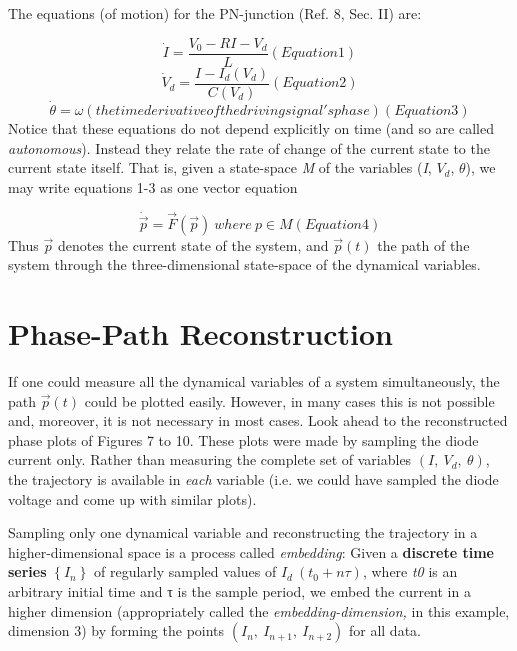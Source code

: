 \documentclass{../lab}
\begin{document}
The equations (of motion) for the PN-junction (Ref. 8, Sec. II) are:

\begin{equation}
    \dot I = \frac{V_0-RI-V_d}{L}  (Equation 1)
\end{equation}
\begin{equation}
    \dot V_d = \frac{I-I_d(V_d)}{C(V_d)}  (Equation 2)
\end{equation}
\begin{equation}
    \dot \theta =\omega  (the time derivative of the driving signal's phase) (Equation 3)
\end{equation}
Notice that these equations do not depend explicitly on time (and so are called \emph{autonomous}). Instead they relate the rate of change of the current state to the current state itself. That is, given a state-space \emph{M} of the variables (\emph{I}, $V_d$, $ \theta $), we may write equations 1-3 as one vector equation

\begin{equation}
    \dot{\vec p}=\vec F (\vec p)~where~p \in M  (Equation 4)
\end{equation}
Thus $ \vec p $ denotes the current state of the system, and $ \vec p(t) $ the path of the system through the three-dimensional state-space of the dynamical variables.

\section{Phase-Path Reconstruction}

If one could measure all the dynamical variables of a system simultaneously, the path $ \vec p(t) $ could be plotted easily. However, in many cases this is not possible and, moreover, it is not necessary in most cases. Look ahead to the reconstructed phase plots of Figures 7 to 10. These plots were made by sampling the diode current only. Rather than measuring the complete set of variables $ (I,~V_d,~\theta) $, the trajectory is available in \emph{each} variable (i.e. we could have sampled the diode voltage and come up with similar plots).

Sampling only one dynamical variable and reconstructing the trajectory in a higher-dimensional space is a process called \emph{embedding}: Given a \textbf{discrete time series} $ \left \{I_n \right\} $ of regularly sampled values of $ I_d~(t_0+n\tau) $, where \emph{t0} is an arbitrary initial time and τ is the sample period, we embed the current in a higher dimension (appropriately called the \emph{embedding-dimension,} in this example, dimension 3) by forming the points $ (I_n,~I_{n+1},~I_{n+2}) $ for all data.
\end{document}
